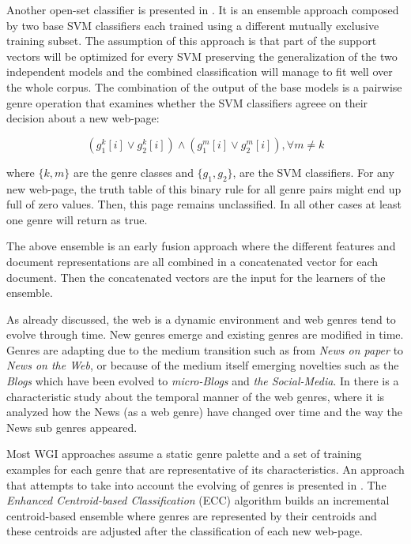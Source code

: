 Another open-set classifier is presented in \parencite{chen2012genre}. It is an ensemble approach composed by two base SVM classifiers each trained using a different mutually exclusive training subset. The assumption of this approach is that part of the support vectors will be optimized for every SVM preserving the generalization of the two independent models and the combined classification will manage to fit well over the whole corpus. The combination of the output of the base models is a pairwise genre operation that examines whether the SVM classifiers agreee on their decision about a new web-page:

\begin{equation}\label{eq:office_doc_ensemble}
	(g^{k}_{1}[i] \vee g^{k}_{2}[i])  \wedge  (g^{m}_{1}[i] \vee g^{m}_{2}[i]) ,   \forall m \neq k
\end{equation}

where $\{k, m\}$ are the genre classes and $\{g_{1}, g_{2}\}$, are the SVM classifiers. For any new web-page, the truth table of this binary rule for all genre pairs might end up full of zero values. Then, this page remains unclassified. In all other cases at least one genre will return as true. 
		
The above ensemble is an early fusion approach where the different features and document representations are all combined in a concatenated vector for each document. Then the concatenated vectors are the input for the learners of the ensemble.

As already discussed, the web is a dynamic environment and web genres tend to evolve through time. New genres  emerge and existing genres are modified in time. Genres are adapting due to the medium transition such as from \textit{News on paper} to \textit{News on the Web}, or because of the medium itself emerging novelties such as the \textit{Blogs} which have been evolved to \textit{micro-Blogs} and \textit{the Social-Media}. In \parencite{caple2017genre} there is a characteristic study about the temporal manner of the web genres, where it is analyzed how the News (as a web genre) have changed over time and the way the News sub genres appeared.

Most WGI approaches assume a static genre palette and a set of training examples for each genre that are representative of its characteristics. An approach that attempts to take into account the evolving of genres is presented in . The \textit{Enhanced Centroid-based Classification} (ECC) algorithm builds an incremental centroid-based ensemble where genres are represented by their centroids and these centroids are adjusted after the classification of each new web-page.

